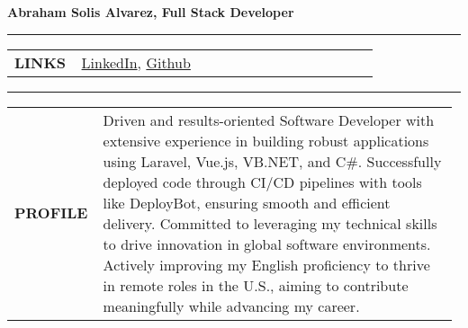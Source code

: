 \documentclass[letter,10pt]{article}
\begin{document}
\begin{center}
    \textbf{ Abraham Solis Alvarez, Full Stack Developer}\\
    \vspace{2mm}
\end{center}

\rule{\linewidth}{0.5pt}
\begin{tabular}{@{}  p{0.18\linewidth} p{0.8\linewidth}  @{}}
\textbf{LINKS} &
\href{https://www.linkedin.com/in/abraham-solis}{LinkedIn}, \href{https://github.com/comrade001}{Github}
\end{tabular}

\vspace{3mm}
\rule{\linewidth}{0.5pt}
\vspace{-3.35mm}
\par
\begin{tabular}{@{} p{0.18\linewidth} p{0.797\linewidth}  @{}}
\textbf{PROFILE} & 
Driven and results-oriented Software Developer with extensive experience in building robust applications using Laravel, Vue.js, VB.NET, and C\#. Successfully deployed code through CI/CD pipelines with tools like DeployBot, ensuring smooth and efficient delivery. Committed to leveraging my technical skills to drive innovation in global software environments. Actively improving my English proficiency to thrive in remote roles in the U.S., aiming to contribute meaningfully while advancing my career.
\end{tabular}
\end{document}
